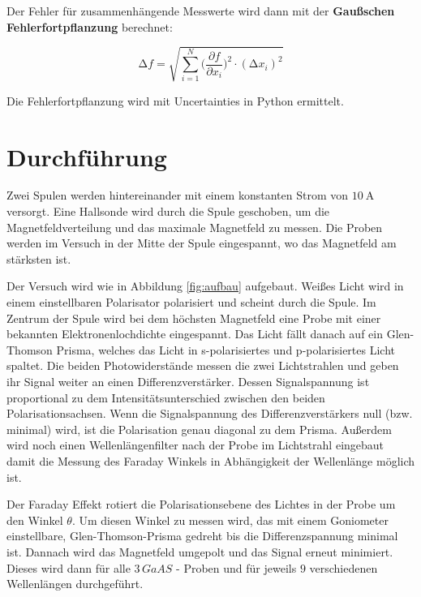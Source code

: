 Der Fehler für zusammenhängende Messwerte wird dann mit der \textbf{Gaußschen
	Fehlerfortpflanzung} berechnet:

\begin{equation}
	\increment{f} = \sqrt{ \sum_{i = 1}^{N}  \biggl(\frac{\partial{f}}{\partial{x_i}}\biggr)^2\cdot(\increment{x_i})^2}
	\label{eqn:Gauss}
\end{equation}

Die Fehlerfortpflanzung wird mit Uncertainties in Python \cite{uncertainties}
ermittelt.


\section{Durchführung\cite{man}}%
Zwei Spulen werden hintereinander mit einem konstanten Strom von
$\qty{10}{\ampere}$ versorgt. Eine Hallsonde wird durch die Spule geschoben, um
die Magnetfeldverteilung und das maximale Magnetfeld zu messen. Die Proben werden im Versuch in der
Mitte der Spule eingespannt, wo das Magnetfeld am stärksten ist.

Der Versuch wird wie in Abbildung \ref{fig:aufbau} aufgebaut. Weißes Licht wird
in einem einstellbaren Polarisator polarisiert und scheint durch die Spule. Im
Zentrum der Spule wird bei dem höchsten Magnetfeld eine Probe mit einer
bekannten Elektronenlochdichte eingespannt. Das Licht fällt danach auf ein
Glen-Thomson Prisma, welches das Licht in s-polarisiertes und p-polarisiertes Licht spaltet. 
Die beiden Photowiderstände messen die zwei Lichtstrahlen und geben ihr Signal weiter an einen Differenzverstärker. 
Dessen Signalspannung ist proportional zu dem Intensitätsunterschied zwischen den beiden Polarisationsachsen. 
Wenn die Signalspannung des Differenzverstärkers null (bzw. minimal) wird, ist die Polarisation genau diagonal zu dem Prisma. 
Außerdem wird noch einen Wellenlängenfilter nach der Probe im Lichtstrahl eingebaut damit 
die Messung des Faraday Winkels in Abhängigkeit der Wellenlänge möglich ist. 

Der Faraday Effekt rotiert die Polarisationsebene des Lichtes in der Probe um den Winkel $\theta$. 
Um diesen Winkel zu messen wird, das mit einem Goniometer einstellbare, Glen-Thomson-Prisma gedreht bis die Differenzspannung minimal ist.
Dannach wird das Magnetfeld umgepolt und das Signal erneut minimiert. 
Dieses wird dann für alle $3 \, GaAS$ - Proben und für jeweils $9$ verschiedenen Wellenlängen durchgeführt. 

